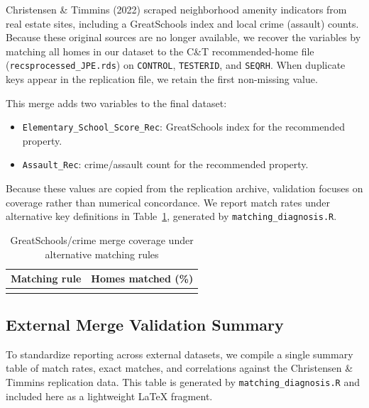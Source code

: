 \documentclass{article}
\begin{document}
Christensen \& Timmins (2022) scraped neighborhood amenity indicators from real estate sites, including a GreatSchools index and local crime (assault) counts. Because these original sources are no longer available, we recover the variables by matching all homes in our dataset to the C\&T recommended-home file (\texttt{recsprocessed\_JPE.rds}) on \texttt{CONTROL}, \texttt{TESTERID}, and \texttt{SEQRH}. When duplicate keys appear in the replication file, we retain the first non-missing value.

This merge adds two variables to the final dataset:
\begin{itemize}
\item \texttt{Elementary\_School\_Score\_Rec}: GreatSchools index for the recommended property.
\item \texttt{Assault\_Rec}: crime/assault count for the recommended property.
\end{itemize}

Because these values are copied from the replication archive, validation focuses on coverage rather than numerical concordance. We report match rates under alternative key definitions in Table~\ref{tab:gs-crime-coverage}, generated by \texttt{matching\_diagnosis.R}.

\begin{table}[h]
\centering
\caption{GreatSchools/crime merge coverage under alternative matching rules}
\label{tab:gs-crime-coverage}
\begin{tabular}{lr}
\toprule
Matching rule & Homes matched (\%) \\
\midrule
\\
\bottomrule
\end{tabular}
\end{table}

\subsection{External Merge Validation Summary}

To standardize reporting across external datasets, we compile a single summary table of match rates, exact matches, and correlations against the Christensen \& Timmins replication data. This table is generated by \texttt{matching\_diagnosis.R} and included here as a lightweight LaTeX fragment.
\end{document}

